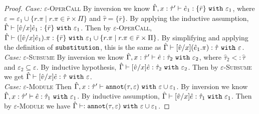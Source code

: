 \begin{proof}
\textit{Case:} \textsc{$\varepsilon$-OperCall} By inversion we know $\hat \Gamma, x: \hat \tau' \vdash \hat e_1: \{ \bar r \}~\mathtt{with}~ \varepsilon_1$, where $\varepsilon = \varepsilon_1 \cup \{ r.\pi \mid r.\pi \in \bar r \times \Pi \}$ and $\hat \tau = \{ \bar r \}$. By applying the inductive assumption, $\hat \Gamma \vdash [\hat v/x]\hat e_1 : \{ \bar r \} ~\mathtt{with}~ \varepsilon_1$. Then by \textsc{$\varepsilon$-OperCall}, $\hat \Gamma \vdash ([\hat v/x]\hat e_1).\pi: \{ \bar r \}~\mathtt{with}~ \varepsilon_1 \cup \{ r.\pi \mid r.\pi \in \bar r \times \Pi \}$. By simplifying and applying the definition of $\mathtt{substitution}$, this is the same as $\hat \Gamma \vdash [\hat v/x](\hat e_1.\pi): \hat \tau~\mathtt{with}~ \varepsilon$.\\

\textit{Case:} \textsc{$\varepsilon$-Subsume} By inversion we know $\hat \Gamma, x: \hat \tau' \vdash \hat e: \hat \tau_2~\mathtt{with}~ \varepsilon_2$, where $\hat \tau_2 <: \hat \tau$ and $\varepsilon_2 \subseteq \varepsilon$. By inductive hypothesis, $\hat \Gamma \vdash [\hat v/x]\hat e: \hat \tau_2~\mathtt{with}~ \varepsilon_2$. Then by \textsc{$\varepsilon$-Subsume} we get $\hat \Gamma \vdash [\hat v/x]\hat e: \hat \tau~\mathtt{with}~ \varepsilon$. \\

\textit{Case:} \textsc{$\varepsilon$-Module} Then $\hat \Gamma, x: \hat \tau' \vdash  \mathtt{annot}(\tau, \varepsilon)~\mathtt{with}~ \varepsilon \cup \varepsilon_1$. By inversion we know $\hat \Gamma, x: \hat \tau' \vdash \hat e: \hat \tau_1~\mathtt{with}~ \varepsilon_1$. By inductive assumption, $\hat \Gamma \vdash [\hat v/x]\hat e: \hat \tau_1~\mathtt{with}~ \varepsilon_1$. Then by \textsc{$\varepsilon$-Module} we have $\hat \Gamma \vdash : \mathtt{annot}(\tau, \varepsilon)~\mathtt{with}~ \varepsilon \cup \varepsilon_1$.
\end{proof}




